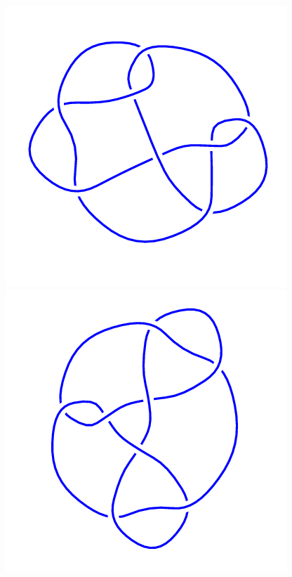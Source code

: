 \begin{figure}[H]
\begin{minipage}[b]{.18\linewidth}
	\end{minipage}
	\begin{minipage}[b]{.18\linewidth}
		\centering
		\includegraphics[width=\linewidth]{../data/8_14.png}
	\end{minipage}
	\begin{minipage}[b]{.18\linewidth}
		\centering
		\includegraphics[width=\linewidth]{../data/8_15.png}

\end{minipage}
\end{figure}
